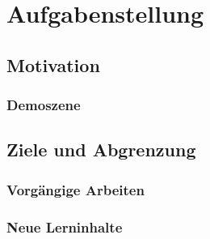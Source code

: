 
\chapter{Aufgabenstellung}
\label{chap:scope}

\section{Motivation}
\label{sec:motivation}


\subsection{Demoszene}
\label{subsec:demoscene}


\section{Ziele und Abgrenzung}
\label{sec:objectives}


\subsection{Vorgängige Arbeiten}
\label{subsec:preliminaries}


\subsection{Neue Lerninhalte}
\label{subsec:new_learning_contents}

